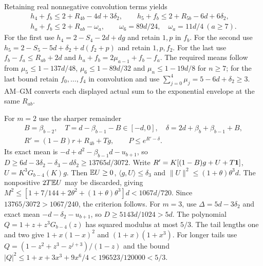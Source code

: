 Retaining real nonnegative convolution terms yields
\begin{gather*}
 h_4+f_b\le2+R_{4b}-4d+3\delta_{2},\qquad
 h_5+f_b\le2+R_{5b}-6d+6\delta_{2},\\
 h_a+f_b\le2+R_{ab}-\omega_a,\qquad
 \omega_6=89d/24,\quad\omega_a=11d/4\ (a\ge7).
\end{gather*}
For the first use $h_4=2-S_4-2d+dg$ and retain $1,p$ in $f_b$.
For the second use $h_5=2-S_5-5d+\delta_{2}+d(f_2+p)$ and retain $1,p,f_2$.
For the last use $f_b-f_a\le R_{ab}+2d$ and
$h_a+f_b=2\mu_{a-1}+f_b-f_a$.
The required means follow from
$\mu_5\le1-137d/48$, $\mu_6\le1-89d/32$ and
$\mu_n\le1-19d/8$ for $n\ge7$; for the last bound retain
$f_0,\ldots,f_4$ in convolution and use
$\sum_{j=0}^4\mu_j=5-6d+\delta_{2}\ge3$.
AM--GM converts each displayed actual sum to the exponential envelope
at the same $R_{ab}$.

For $m=2$ use the sharper remainder
\begin{gather*}
 B=\beta_{b-2},\quad T=d-\beta_{b-1}-B\in[-d,0],\quad
 \delta=2d+\beta_b+\beta_{b-1}+B,\\
 R'=(1-B)r+R_{4b}+Tg,\qquad P\le e^{R'-\delta}.
\end{gather*}
Its exact mean is $-d+d^2-\beta_{b-1}d-u_{b+1}$, so
$D\ge6d-3\delta_{2}-\delta_{3}-d\delta_{2}\ge13765d/3072$.
Write $R'=K[(1-B)g+U+T\mathbf1]$, $U=K^3G_{b-4}(K)g$.
Then $\mathbb E U\ge0$, $\langle g,U\rangle\le \delta_{3}$ and
$\|U\|^2\le(1+\theta)\theta^3d$.
The nonpositive $2T\mathbb E U$ may be discarded, giving
$M^2\le[1+7/144+2\theta^2+(1+\theta)\theta^3]d<1067d/720$.
Since $13765/3072>1067/240$, the criterion follows.
For $m=3$, use $\Delta=5d-3\delta_{2}$ and exact mean
$-d-\delta_{2}-u_{b+1}$, so $D\ge5143d/1024>5d$.
The polynomial $Q=1+z+z^3G_{b-4}(z)$ has squared modulus at most $5/3$.
The tail lengths one and two give $1+x(1-x)^2$ and $(1+x)(1+x^3)$.
For longer tails use
$Q=(1-z^2+z^3-z^{j+3})/(1-z)$ and the bound
$|Q|^2\le1+x+3x^3+9x^6/4<196523/120000<5/3$.

